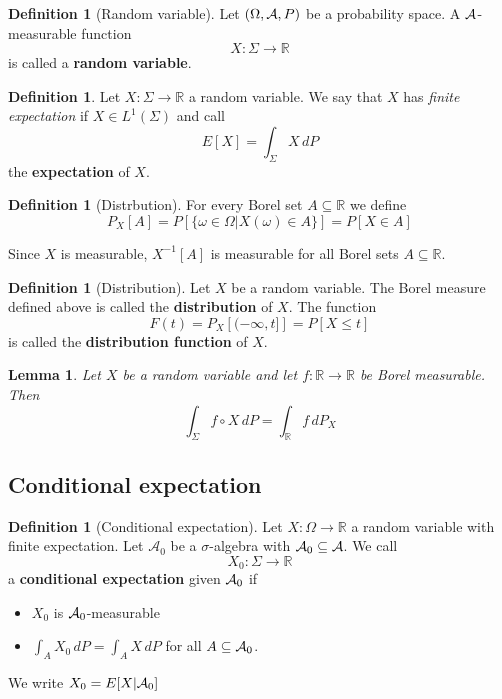 \documentclass[10pt, oneside, reqno]{amsart}
\theoremstyle{plain}%
\newtheorem{lem}[thm]{Lemma}
\theoremstyle{definition}
\newtheorem{defn}[thm]{Definition}
\theoremstyle{remark}
\newcommand{\R}{\mathbb{R}}
\begin{document}
\begin{defn}[Random variable]
	Let $(\Omega, \mathcal{A}, P)$ be a probability space.  A $\mathcal{A}$-measurable function \[
		X : \Sigma \rightarrow \R
	\] is called a \textbf{random variable}. 
\end{defn}

\begin{defn}
	Let $X : \Sigma \rightarrow \R$ a random variable.  We say that $X$ has \emph{finite expectation} if $X \in L^1(\Sigma)$ and call \[
		E[X] = \int_\Sigma X \, dP
	\] the \textbf{expectation} of $X$.  
\end{defn}

\begin{defn}[Distrbution]
	For every Borel set $A \subseteq \R$ we define \[
		P_X[A] = P[ \{ \omega \in \Omega | X(\omega) \in A\}] = P[X \in A]
	\]
\end{defn}

Since $X$ is measurable, $X^{-1}[A]$ is measurable for all Borel sets $A \subseteq \R$. 

\begin{defn}[Distribution]
	Let $X$ be a random variable. The Borel measure defined above is called the \textbf{distribution} of $X$.  The function \[
		F(t) = P_X\left[(-\infty,t] \right] = P[X \leq t]
	\] is called the \textbf{distribution function} of $X$.
\end{defn}

\begin{lem}
	Let $X$ be a random variable and let $f: \R \rightarrow \R$ be Borel measurable.  Then \[
		\int_\Sigma f \circ X \, dP = \int_\R f \, dP_X
	\]
\end{lem}

\subsection{Conditional expectation} %
\label{sub:conditional_expectation}

\begin{defn}[Conditional expectation]
	Let $X: \Omega \rightarrow \R$ a random variable with finite expectation.  Let $\mathcal{A}_0$ be a $\sigma$-algebra with $\mathcal{A}_0 \subseteq \mathcal{A}$. We call \[
		X_0 : \Sigma \rightarrow \R
	\] a \textbf{conditional expectation} given $\mathcal{A}_0$ if 
	\begin{itemize}
		\item $X_0$ is $\mathcal{A}_0$-measurable
		\item $\int_A X_0 \, dP = \int_A X \, dP$ for all $A \subseteq \mathcal{A}_0$.
	\end{itemize}
	We write $X_0 = E[X | \mathcal{A}_0]$
\end{defn}
\end{document}

